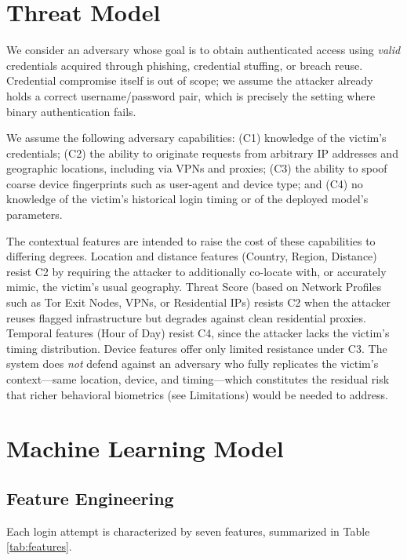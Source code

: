 \documentclass[conference]{IEEEtran}
\begin{document}
\section{Threat Model}\label{sec:threat}
We consider an adversary whose goal is to obtain authenticated access using \textit{valid} credentials acquired through phishing, credential stuffing, or breach reuse. Credential compromise itself is out of scope; we assume the attacker already holds a correct username/password pair, which is precisely the setting where binary authentication fails.

We assume the following adversary capabilities: (C1) knowledge of the victim's credentials; (C2) the ability to originate requests from arbitrary IP addresses and geographic locations, including via VPNs and proxies; (C3) the ability to spoof coarse device fingerprints such as user-agent and device type; and (C4) no knowledge of the victim's historical login timing or of the deployed model's parameters.

The contextual features are intended to raise the cost of these capabilities to differing degrees. Location and distance features (Country, Region, Distance) resist C2 by requiring the attacker to additionally co-locate with, or accurately mimic, the victim's usual geography. Threat Score (based on Network Profiles such as Tor Exit Nodes, VPNs, or Residential IPs) resists C2 when the attacker reuses flagged infrastructure but degrades against clean residential proxies. Temporal features (Hour of Day) resist C4, since the attacker lacks the victim's timing distribution. Device features offer only limited resistance under C3. The system does \textit{not} defend against an adversary who fully replicates the victim's context---same location, device, and timing---which constitutes the residual risk that richer behavioral biometrics (see Limitations) would be needed to address.

\section{Machine Learning Model}
\subsection{Feature Engineering}
Each login attempt is characterized by seven features, summarized in Table \ref{tab:features}.
\end{document}
